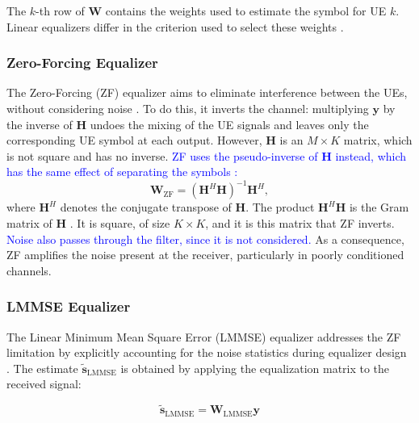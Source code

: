 The $k$-th row of $\mathbf W$ contains the weights used to estimate the symbol for UE $k$. Linear equalizers differ in the criterion used to select these weights \cite{tse-viswanath}.

\subsubsection{Zero-Forcing Equalizer}\label{subsubsec:zf}
The Zero-Forcing (ZF) equalizer aims to eliminate interference between the UEs, without considering noise \cite{tse-viswanath}. To do this, it inverts the channel: multiplying $\mathbf y$ by the inverse of $\mathbf H$ undoes the mixing of the UE signals and leaves only the corresponding UE symbol at each output. However, $\mathbf H$ is an $M \times K$ matrix, which is not square and has no inverse. \textcolor{blue}{ZF uses the pseudo-inverse of $\mathbf H$ instead, which has the same effect of separating the symbols \cite{zero-forcing}:}
\begin{equation}
\mathbf{W}_\text{ZF}=
\left(\mathbf{H}^H\mathbf{H}\right)^{-1}\mathbf{H}^H,
\label{eq:zf_filter}
\end{equation}
where $\mathbf{H}^H$ denotes the conjugate transpose of $\mathbf{H}$. The product $\mathbf H^H\mathbf H$ is the Gram matrix of $\mathbf H$ \cite{jeon2019}. It is square, of size $K \times K$, and it is this matrix that ZF inverts. \textcolor{blue}{Noise also passes through the filter, since it is not considered.} As a consequence, ZF amplifies the noise present at the receiver, particularly in poorly conditioned channels.

\subsubsection{LMMSE Equalizer}\label{subsubsec:lmmse}
The Linear Minimum Mean Square Error (LMMSE) equalizer addresses the ZF
limitation by explicitly accounting for the noise statistics during equalizer
design \cite{tse-viswanath}. The estimate $\tilde{\mathbf{s}}_\text{LMMSE}$ is obtained by applying the
equalization matrix to the received signal:

\begin{equation}
\tilde{\mathbf{s}}_\text{LMMSE}=
\mathbf{W}_\text{LMMSE}\mathbf{y}
\label{eq:lmmse_estimate}
\end{equation}

